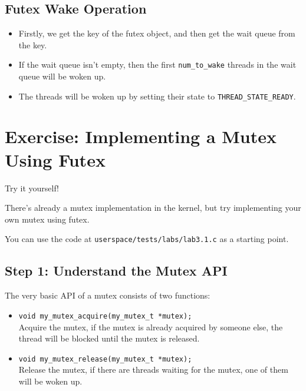 \subsection{Futex Wake Operation}

\begin{itemize}
    \item Firstly, we get the key of the futex object, and then get the wait queue
          from the key.
    \item If the wait queue isn't empty, then the first \texttt{num\_to\_wake} threads
          in the wait queue will be woken up.
    \item The threads will be woken up by setting their state to \texttt{THREAD\_STATE\_READY}.
\end{itemize}

\section*{Exercise: Implementing a Mutex Using Futex}

\begin{exercise*}{Try it yourself!}
    \item There's already a mutex implementation in the kernel, but try implementing
    your own mutex using futex.
    \item You can use the code at \texttt{userspace/tests/labs/lab3.1.c} as a starting point.
\end{exercise*}

\subsection{Step 1: Understand the Mutex API}

The very basic API of a mutex consists of two functions:

\begin{itemize}
    \item \texttt{void my\_mutex\_acquire(my\_mutex\_t *mutex);} \\
          Acquire the mutex, if the mutex is already acquired by someone else, the
          thread will be blocked until the mutex is released.
    \item \texttt{void my\_mutex\_release(my\_mutex\_t *mutex);} \\
          Release the mutex, if there are threads waiting for the mutex, one of them
          will be woken up.
\end{itemize}

